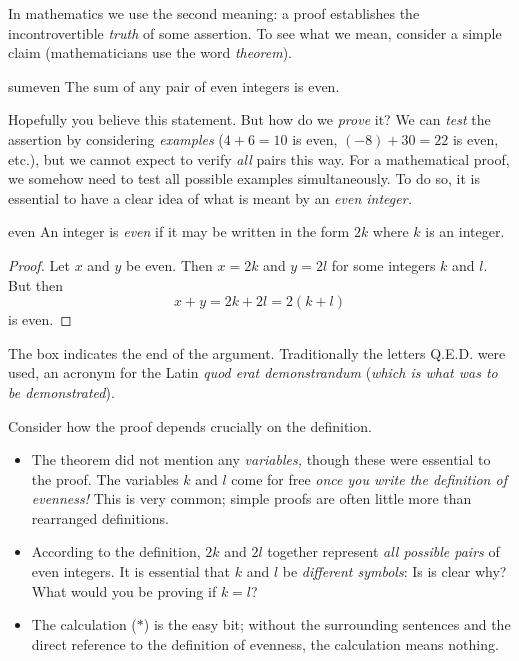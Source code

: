 In mathematics we use the second meaning: a proof establishes the incontrovertible \emph{truth} of some assertion. To see what we mean, consider a simple claim (mathematicians use the word \emph{theorem}).

\begin{thm}{}{sumeven}
	The sum of any pair of even integers is even.
\end{thm}

Hopefully you believe this statement. But how do we \emph{prove} it? We can \emph{test} the assertion by considering \emph{examples} ($4+6=10$ is even, $(-8)+30=22$ is even, etc.), but we cannot expect to verify \emph{all} pairs this way. For a mathematical proof, we somehow need to test all possible examples simultaneously. To do so, it is essential to have a clear idea of what is meant by an \emph{even integer.}

\begin{defn}{}{even}
	An integer is \emph{even} if it may be written in the form $2k$ where $k$ is an integer.
\end{defn}

\begin{proof}
	Let $x$ and $y$ be even. Then $x=2k$ and $y=2l$ for some integers $k$ and $l$. But then
	\[
		x+y=2k+2l=2(k+l)\tag{$\ast$}
	\]
	is even.
\end{proof}

The box \smash{\raisebox{8pt}{$\qedsymbol$}} indicates the end of the argument. Traditionally the letters Q.E.D.{} were used, an acronym for the Latin \emph{quod erat demonstrandum} (\emph{which is what was to be demonstrated}).
\smallbreak

Consider how the proof depends crucially on the definition.

\begin{itemize}\itemsep0pt
	\item The theorem did not mention any \emph{variables,} though these were essential to the proof. The variables $k$ and $l$ come for free \emph{once you write the definition of evenness!} This is very common; simple proofs are often little more than rearranged definitions.
	\item According to the definition, $2k$ and $2l$ together represent \emph{all possible pairs} of even integers. It is essential that $k$ and $l$ be \emph{different symbols}: Is is clear why? What would you be proving if $k=l$? %
	\item The calculation ($\ast$) is the easy bit; without the surrounding sentences and the direct reference to the definition of evenness, the calculation means nothing.
\end{itemize}

